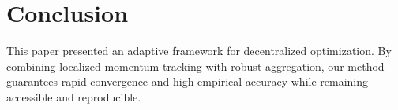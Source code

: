 \documentclass[journal]{IEEEtran}
\begin{document}
\section{Conclusion}
This paper presented an adaptive framework for decentralized optimization. By combining localized momentum tracking with robust aggregation, our method guarantees rapid convergence and high empirical accuracy while remaining accessible and reproducible.

\nocite{*}


\end{document}
